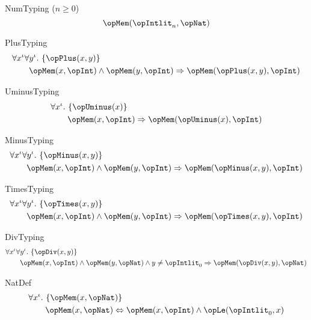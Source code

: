 \documentclass[11pt, a4paper, oneside]{article}
\begin{document}
\begin{axioms}
\item[NumTyping ($n \ge 0$)] \[
        \opMem(\opIntlit_n, \opNat)
    \]

\item[PlusTyping] \[
        \begin{aligned}
            &\forall x^\idv \forall y^\idv.\, \st{ \opPlus(x, y) } \\
            &\qquad \opMem(x, \opInt) \wedge \opMem(y, \opInt) \imp \opMem(\opPlus(x, y), \opInt)
        \end{aligned}
    \]

\item[UminusTyping] \[
        \begin{aligned}
            &\forall x^\idv.\, \st{ \opUminus(x) } \\
            &\qquad \opMem(x, \opInt) \imp \opMem(\opUminus(x), \opInt)
        \end{aligned}
    \]

\item[MinusTyping] \[
        \begin{aligned}
            &\forall x^\idv \forall y^\idv.\, \st{ \opMinus(x, y) } \\
            &\qquad \opMem(x, \opInt) \wedge \opMem(y, \opInt) \imp \opMem(\opMinus(x, y), \opInt)
        \end{aligned}
    \]

\item[TimesTyping] \[
        \begin{aligned}
            &\forall x^\idv \forall y^\idv.\, \st{ \opTimes(x, y) } \\
            &\qquad \opMem(x, \opInt) \wedge \opMem(y, \opInt) \imp \opMem(\opTimes(x, y), \opInt)
        \end{aligned}
    \]

\item[DivTyping] \[
        \begin{aligned}
            &\forall x^\idv \forall y^\idv.\, \st{ \opDiv(x, y) } \\
            &\qquad \opMem(x, \opInt) \wedge \opMem(y, \opNat) \wedge y \neq \opIntlit_0 \imp \opMem(\opDiv(x, y), \opNat)
        \end{aligned}
    \]

\item[NatDef] \[
        \begin{aligned}
            &\forall x^\idv.\, \st{ \opMem(x, \opNat) } \\
            &\qquad \opMem(x, \opNat) \eqv \opMem(x, \opInt) \wedge \opLe(\opIntlit_0, x)
        \end{aligned}
    \]


\end{axioms}
\end{document}
